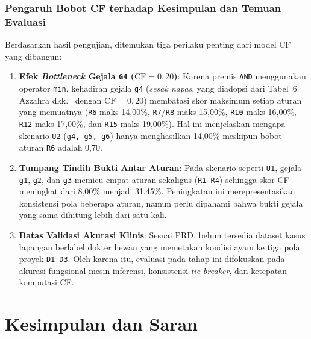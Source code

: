 \documentclass[12pt,a4paper]{report}
\begin{document}
\subsection{Pengaruh Bobot CF terhadap Kesimpulan dan Temuan Evaluasi}
Berdasarkan hasil pengujian, ditemukan tiga perilaku penting dari model CF yang dibangun:
\begin{enumerate}
  \item \textbf{Efek \textit{Bottleneck} Gejala \texttt{G4} ($\text{CF}=0{,}20$)}: Karena premis \texttt{AND} menggunakan operator \texttt{min}, kehadiran gejala \texttt{g4} (\textit{sesak napas}, yang diadopsi dari Tabel~6 Azzahra dkk.~\cite{azzahra2026} dengan $\text{CF}=0{,}20$) membatasi skor maksimum setiap aturan yang memuatnya (\texttt{R6} maks 14,00\%, \texttt{R7}/\texttt{R8} maks 15,00\%, \texttt{R10} maks 16,00\%, \texttt{R12} maks 17,00\%, dan \texttt{R15} maks 19,00\%). Hal ini menjelaskan mengapa skenario \texttt{U2} (\texttt{g4, g5, g6}) hanya menghasilkan 14,00\% meskipun bobot aturan \texttt{R6} adalah 0,70.
  \item \textbf{Tumpang Tindih Bukti Antar Aturan}: Pada skenario seperti \texttt{U1}, gejala \texttt{g1}, \texttt{g2}, dan \texttt{g3} memicu empat aturan sekaligus (\texttt{R1}--\texttt{R4}) sehingga skor CF meningkat dari 8,00\% menjadi 31,45\%. Peningkatan ini merepresentasikan konsistensi pola beberapa aturan, namun perlu dipahami bahwa bukti gejala yang sama dihitung lebih dari satu kali.
  \item \textbf{Batas Validasi Akurasi Klinis}: Sesuai PRD, belum tersedia dataset kasus lapangan berlabel dokter hewan yang memetakan kondisi ayam ke tiga pola proyek \texttt{D1}--\texttt{D3}. Oleh karena itu, evaluasi pada tahap ini difokuskan pada akurasi fungsional mesin inferensi, konsistensi \textit{tie-breaker}, dan ketepatan komputasi CF.
\end{enumerate}

\chapter{Kesimpulan dan Saran}
\end{document}
